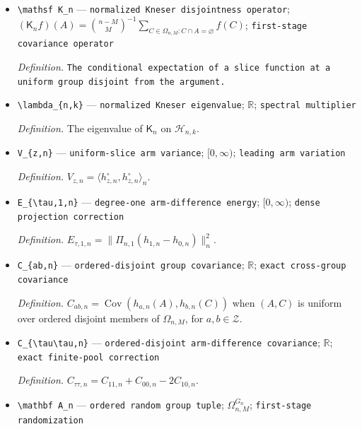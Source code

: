 \documentclass{article}
\begin{document}
\begin{itemize}
  \item \texttt{\textbackslash{}\allowbreak{}mathsf K\_\allowbreak{}n} --- \texttt{normalized Kneser disjointness operator}; \((\mathsf K_nf)(A)=\binom{n-M}{M}^{-1}\sum_{C\in\Omega_{n,M}:C\cap A=\varnothing}f(C)\); \texttt{first-\allowbreak{}stage covariance operator}
  \par\smallskip\noindent\emph{Definition.} \texttt{The conditional expectation of a slice function at a uniform group disjoint from the argument.}
  \item \texttt{\textbackslash{}\allowbreak{}lambda\_\allowbreak{}\{n,\allowbreak{}k\}\allowbreak{}} --- \texttt{normalized Kneser eigenvalue}; \(\mathbb R\); \texttt{spectral multiplier}
  \par\smallskip\noindent\emph{Definition.} The eigenvalue of \(\mathsf K_n\) on \(\mathcal H_{n,k}\).
  \item \texttt{V\_\allowbreak{}\{z,\allowbreak{}n\}\allowbreak{}} --- \texttt{uniform-\allowbreak{}slice arm variance}; \([0,\infty)\); \texttt{leading arm variation}
  \par\smallskip\noindent\emph{Definition.} \(V_{z,n}=\langle h_{z,n}^{\circ},h_{z,n}^{\circ}\rangle_n\).
  \item \texttt{E\_\allowbreak{}\{\textbackslash{}\allowbreak{}tau,\allowbreak{}1,\allowbreak{}n\}\allowbreak{}} --- \texttt{degree-\allowbreak{}one arm-\allowbreak{}difference energy}; \([0,\infty)\); \texttt{dense projection correction}
  \par\smallskip\noindent\emph{Definition.} \(E_{\tau,1,n}=\|\Pi_{n,1}(h_{1,n}-h_{0,n})\|_n^2\).
  \item \texttt{C\_\allowbreak{}\{ab,\allowbreak{}n\}\allowbreak{}} --- \texttt{ordered-\allowbreak{}disjoint group covariance}; \(\mathbb R\); \texttt{exact cross-\allowbreak{}group covariance}
  \par\smallskip\noindent\emph{Definition.} \(C_{ab,n}=\operatorname{Cov}(h_{a,n}(A),h_{b,n}(C))\) when \((A,C)\) is uniform over ordered disjoint members of \(\Omega_{n,M}\), for \(a,b\in\mathcal Z\).
  \item \texttt{C\_\allowbreak{}\{\textbackslash{}\allowbreak{}tau\textbackslash{}\allowbreak{}tau,\allowbreak{}n\}\allowbreak{}} --- \texttt{ordered-\allowbreak{}disjoint arm-\allowbreak{}difference covariance}; \(\mathbb R\); \texttt{exact finite-\allowbreak{}pool correction}
  \par\smallskip\noindent\emph{Definition.} \(C_{\tau\tau,n}=C_{11,n}+C_{00,n}-2C_{10,n}\).
  \item \texttt{\textbackslash{}\allowbreak{}mathbf A\_\allowbreak{}n} --- \texttt{ordered random group tuple}; \(\Omega_{n,M}^{G_n}\); \texttt{first-\allowbreak{}stage randomization}

\end{itemize}
\end{document}
